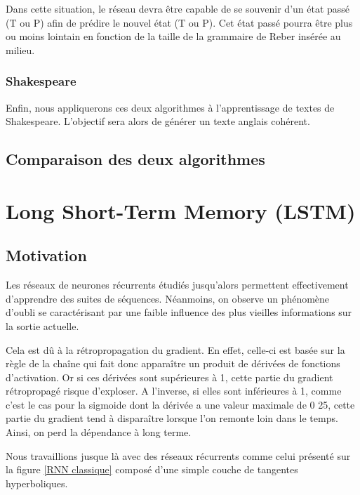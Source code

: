 \documentclass{report}
\theoremstyle{plain}
\theoremstyle{definition}
\theoremstyle{remark}
\begin{document}
Dans cette situation, le réseau devra être capable de se souvenir d'un état passé (T ou P) afin de prédire le nouvel état (T ou P). Cet état passé pourra être plus ou moins lointain en fonction de la taille de la grammaire de Reber insérée au milieu. 
\bigbreak
\bigbreak

\subsection{Shakespeare}

Enfin, nous appliquerons ces deux algorithmes à l'apprentissage de textes de Shakespeare. L'objectif sera alors de générer un texte anglais cohérent.

\section{Comparaison des deux algorithmes}

\chapter{Long Short-Term Memory (LSTM)}
\section{Motivation}
Les réseaux de neurones récurrents étudiés jusqu'alors permettent effectivement d'apprendre des suites de séquences. Néanmoins, on observe un phénomène d'oubli se caractérisant par une faible influence des plus vieilles informations sur la sortie actuelle.

Cela est dû à la rétropropagation du gradient. En effet, celle-ci est basée sur la règle de la chaîne qui fait donc apparaître un produit de dérivées de fonctions d'activation. Or si ces dérivées sont supérieures à 1, cette partie du gradient rétropropagé risque d'exploser. A l'inverse, si elles sont inférieures à 1, comme c'est le cas pour la sigmoide dont la dérivée a une valeur maximale de 0
25, cette partie du gradient tend à disparaître lorsque l'on remonte loin dans le temps. Ainsi, on perd la dépendance à long terme.

Nous travaillions jusque là avec des réseaux récurrents comme celui présenté sur la figure \ref{RNN classique} composé d'une simple couche de tangentes hyperboliques.
\end{document}

